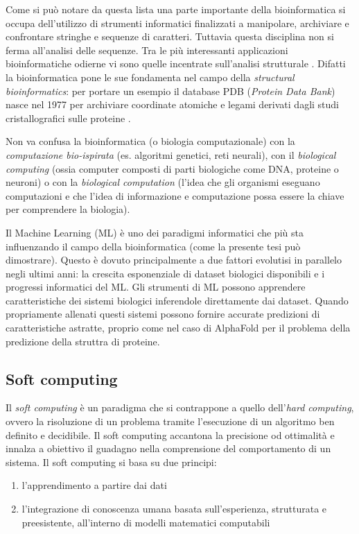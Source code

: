 \par Come si può notare da questa lista una parte importante della bioinformatica si occupa dell'utilizzo di strumenti informatici finalizzati a manipolare, archiviare e confrontare stringhe e sequenze di caratteri. Tuttavia questa disciplina non si ferma all’analisi delle sequenze. Tra le più interessanti applicazioni bioinformatiche odierne vi sono quelle incentrate sull’analisi strutturale \supercite{baxevanis2020bioinformatics}. Difatti la bioinformatica pone le sue fondamenta nel campo della \textit{structural bioinformatics}: per portare un esempio il database PDB (\textit{Protein Data Bank}) nasce nel 1977 per archiviare coordinate atomiche e legami derivati dagli studi cristallografici sulle proteine \supercite{bernstein77}.

\par Non va confusa la bioinformatica (o biologia computazionale) con la \textit{computazione bio-ispirata} (es. algoritmi genetici, reti neurali), con il \textit{biological computing} (ossia computer composti di parti biologiche come DNA, proteine o neuroni) o con la \textit{biological computation} (l'idea che gli organismi eseguano computazioni e che l'idea di informazione e computazione possa essere la chiave per comprendere la biologia)\supercite{Mitchell2010}.

\par Il Machine Learning (ML) è uno dei paradigmi informatici che più sta influenzando il campo della bioinformatica (come la presente tesi può dimostrare). Questo è dovuto principalmente a due fattori evolutisi in parallelo negli ultimi anni: la crescita esponenziale di dataset biologici disponibili e i progressi informatici del ML. Gli strumenti di ML possono apprendere caratteristiche dei sistemi biologici inferendole direttamente dai dataset. Quando propriamente allenati questi sistemi possono fornire accurate predizioni di caratteristiche astratte, proprio come nel caso di AlphaFold per il problema della predizione della struttra di proteine.

\subsection{Soft computing}
Il \textit{soft computing} è un paradigma che si contrappone a quello dell'\textit{hard computing}, ovvero la risoluzione di un problema tramite l'esecuzione di un algoritmo ben definito e decidibile. Il soft computing accantona la precisione od ottimalità e innalza a obiettivo il guadagno nella comprensione del comportamento di un sistema. Il soft computing si basa su due principi: 
\begin{enumerate}
	\item l'apprendimento a partire dai dati
	\item l'integrazione di conoscenza umana basata sull'esperienza, strutturata e preesistente, all'interno di modelli matematici computabili
\end{enumerate}

